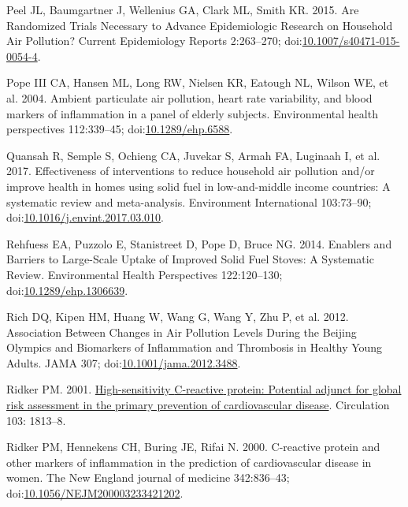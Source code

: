 \documentclass[
  letterpaper,
  DIV=11,
  numbers=noendperiod]{scrartcl}
\newlength{\cslhangindent}
\newenvironment{CSLReferences}[2] %
 {\begin{list}{}{%
  \setlength{\itemindent}{0pt}
  \setlength{\leftmargin}{0pt}
  \setlength{\parsep}{0pt}
  \ifodd #1
   \setlength{\leftmargin}{\cslhangindent}
   \setlength{\itemindent}{-1\cslhangindent}
  \fi
  \setlength{\itemsep}{#2\baselineskip}}}
 {\end{list}}
\begin{document}
\begin{CSLReferences}{1}{1}
Peel JL, Baumgartner J, Wellenius GA, Clark ML, Smith KR. 2015. Are
{Randomized Trials Necessary} to {Advance Epidemiologic Research} on
{Household Air Pollution}? Current Epidemiology Reports 2:263--270;
doi:\href{https://doi.org/10.1007/s40471-015-0054-4}{10.1007/s40471-015-0054-4}.

Pope III CA, Hansen ML, Long RW, Nielsen KR, Eatough NL, Wilson WE, et
al. 2004. Ambient particulate air pollution, heart rate variability, and
blood markers of inflammation in a panel of elderly subjects.
Environmental health perspectives 112:339--45;
doi:\href{https://doi.org/10.1289/ehp.6588}{10.1289/ehp.6588}.

Quansah R, Semple S, Ochieng CA, Juvekar S, Armah FA, Luginaah I, et al.
2017. Effectiveness of interventions to reduce household air pollution
and/or improve health in homes using solid fuel in low-and-middle income
countries: {A} systematic review and meta-analysis. Environment
International 103:73--90;
doi:\href{https://doi.org/10.1016/j.envint.2017.03.010}{10.1016/j.envint.2017.03.010}.

Rehfuess EA, Puzzolo E, Stanistreet D, Pope D, Bruce NG. 2014. Enablers
and {Barriers} to {Large-Scale Uptake} of {Improved Solid Fuel Stoves}:
{A Systematic Review}. Environmental Health Perspectives 122:120--130;
doi:\href{https://doi.org/10.1289/ehp.1306639}{10.1289/ehp.1306639}.

Rich DQ, Kipen HM, Huang W, Wang G, Wang Y, Zhu P, et al. 2012.
Association {Between Changes} in {Air Pollution Levels During} the
{Beijing Olympics} and {Biomarkers} of {Inflammation} and {Thrombosis}
in {Healthy Young Adults}. JAMA 307;
doi:\href{https://doi.org/10.1001/jama.2012.3488}{10.1001/jama.2012.3488}.

Ridker PM. 2001.
\href{https://www.ncbi.nlm.nih.gov/pubmed/11282915}{High-sensitivity
{C-reactive} protein: Potential adjunct for global risk assessment in
the primary prevention of cardiovascular disease}. Circulation 103:
1813--8.

Ridker PM, Hennekens CH, Buring JE, Rifai N. 2000. C-reactive protein
and other markers of inflammation in the prediction of cardiovascular
disease in women. The New England journal of medicine 342:836--43;
doi:\href{https://doi.org/10.1056/NEJM200003233421202}{10.1056/NEJM200003233421202}.


\end{CSLReferences}
\end{document}
